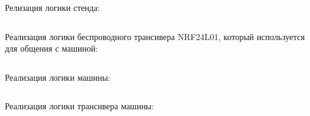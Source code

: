 Релизация логики стенда:

\inputminted[fontsize=\footnotesize, linenos]{cpp}{final/command_tour/vrs/task_02/source_1.cpp}

Реализация логики беспроводного трансивера NRF24L01, который используется для общения с машиной:

\inputminted[fontsize=\footnotesize, linenos]{cpp}{final/command_tour/vrs/task_02/source_2.cpp}

Реализация логики машины:

\inputminted[fontsize=\footnotesize, linenos]{cpp}{final/command_tour/vrs/task_02/source_3.cpp}

Реализация логики трансивера машины:

\inputminted[fontsize=\footnotesize, linenos]{cpp}{final/command_tour/vrs/task_02/source_4.cpp}
